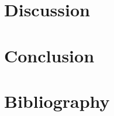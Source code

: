 \documentclass[%
preprint, linenumbers,
groupedaddress,
amsmath,amssymb,
aps, physrev,
]{revtex4-2}
\begin{document}

\section{Discussion}




\section{Conclusion}

\clearpage



\nocite{*}

\section{Bibliography}

\clearpage

\appendix


\end{document}
